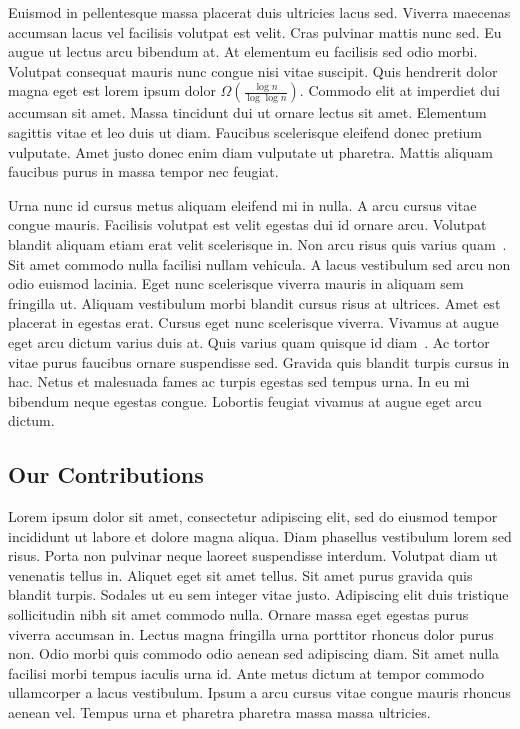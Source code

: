 Euismod in pellentesque massa placerat duis ultricies lacus sed. Viverra
maecenas accumsan lacus vel facilisis volutpat est velit. Cras pulvinar mattis
nunc sed. Eu augue ut lectus arcu bibendum at. At elementum eu facilisis sed
odio morbi. Volutpat consequat mauris nunc congue nisi vitae suscipit. Quis
hendrerit dolor magna eget est lorem ipsum dolor $\Omega(\frac{\log n}{\log
\log n})$. Commodo elit at imperdiet dui accumsan sit amet. Massa tincidunt dui
ut ornare lectus sit amet. Elementum sagittis vitae et leo duis ut diam.
Faucibus scelerisque eleifend donec pretium vulputate. Amet justo donec enim
diam vulputate ut pharetra. Mattis aliquam faucibus purus in massa tempor nec
feugiat.\par

Urna nunc id cursus metus aliquam eleifend mi in nulla. A arcu cursus vitae
congue mauris. Facilisis volutpat est velit egestas dui id ornare arcu.
Volutpat blandit aliquam etiam erat velit scelerisque in. Non arcu risus quis
varius quam~\cite{Spencer+:jacm06}. Sit amet commodo nulla facilisi nullam vehicula. A lacus
vestibulum sed arcu non odio euismod lacinia. Eget nunc scelerisque viverra
mauris in aliquam sem fringilla ut. Aliquam vestibulum morbi blandit cursus
risus at ultrices. Amet est placerat in egestas erat. Cursus eget nunc
scelerisque viverra. Vivamus at augue eget arcu dictum varius duis at. Quis
varius quam quisque id diam~\cite{Appa+:crypto18}. Ac tortor vitae purus faucibus ornare suspendisse
sed. Gravida quis blandit turpis cursus in hac. Netus et malesuada fames ac
turpis egestas sed tempus urna. In eu mi bibendum neque egestas congue.
Lobortis feugiat vivamus at augue eget arcu dictum.\par

\subsection{Our Contributions}

Lorem ipsum dolor sit amet, consectetur adipiscing elit, sed do eiusmod tempor
incididunt ut labore et dolore magna aliqua. Diam phasellus vestibulum lorem
sed risus. Porta non pulvinar neque laoreet suspendisse interdum. Volutpat diam
ut venenatis tellus in. Aliquet eget sit amet tellus. Sit amet purus gravida
quis blandit turpis. Sodales ut eu sem integer vitae justo. Adipiscing elit
duis tristique sollicitudin nibh sit amet commodo nulla. Ornare massa eget
egestas purus viverra accumsan in. Lectus magna fringilla urna porttitor
rhoncus dolor purus non. Odio morbi quis commodo odio aenean sed adipiscing
diam. Sit amet nulla facilisi morbi tempus iaculis urna id. Ante metus dictum
at tempor commodo ullamcorper a lacus vestibulum. Ipsum a arcu cursus vitae
congue mauris rhoncus aenean vel. Tempus urna et pharetra pharetra massa massa
ultricies.

